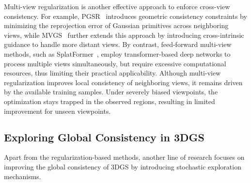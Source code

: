 \documentclass[lettersize,journal]{IEEEtran}
\begin{document}
Multi-view regularization is another effective approach to enforce cross-view consistency. For example, 
PGSR~\cite{pgsr} introduces geometric consistency constraints by minimizing the reprojection error of Gaussian primitives across neighboring views, 
while MVGS~\cite{mvgs} further extends this approach by introducing cross-intrinsic guidance to handle more distant views. 
By contrast, feed-forward multi-view methods, such as SplatFormer~\cite{splatformer}, employ transformer-based deep networks to process multiple views simultaneously, but require excessive computational resources, thus limiting their practical applicability.
Although multi-view regularization improves local consistency of neighboring views, it remains driven by the available training samples. Under severely biased viewpoints, the optimization stays trapped in the observed regions, resulting in limited improvement for unseen viewpoints.


\subsection{Exploring Global Consistency in 3DGS}

Apart from the regularization-based methods, another line of research focuses on improving the global consistency of 3DGS by introducing stochastic exploration mechanisms. 
\end{document}

